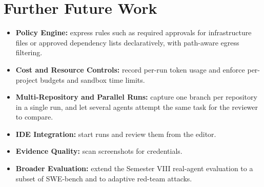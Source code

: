 \documentclass[12pt,a4paper,oneside]{report}
\providecommand{\tightlist}{\setlength{\itemsep}{0pt}\setlength{\parskip}{0pt}}
\begin{document}
\section{Further Future Work}\label{further-future-work}

\begin{itemize}
\tightlist
\item
  \textbf{Policy Engine:} express rules such as required approvals for infrastructure files or approved dependency lists declaratively, with path-aware egress filtering.
\item
  \textbf{Cost and Resource Controls:} record per-run token usage and enforce per-project budgets and sandbox time limits.
\item
  \textbf{Multi-Repository and Parallel Runs:} capture one branch per repository in a single run, and let several agents attempt the same task for the reviewer to compare.
\item
  \textbf{IDE Integration:} start runs and review them from the editor.
\item
  \textbf{Evidence Quality:} scan screenshots for credentials.
\item
  \textbf{Broader Evaluation:} extend the Semester VIII real-agent evaluation to a subset of SWE-bench \cite{ref2} and to adaptive red-team attacks.
\end{itemize}

\clearpage
\end{document}
